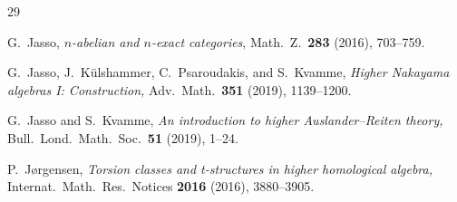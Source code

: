 \documentclass[12pt,reqno]{amsart}
\numberwithin{equation}{section}
\theoremstyle{definition}
\theoremstyle{theorem}
\theoremstyle{definition}
\begin{document}
\begin{thebibliography}{29}

  G.\ Jasso, {\it $n$-abelian and $n$-exact categories}, Math.\ Z.\ {\bf 283} (2016), 703--759.


  G.\ Jasso, J.\ K\"{u}lshammer, C.\ Psaroudakis, and S.\ Kvamme, {\it Higher Nakayama algebras I: Construction,} Adv.\ Math.\ {\bf 351} (2019), 1139--1200.

  G.\ Jasso and S.\ Kvamme, {\it An introduction to higher Auslander--Reiten theory,} Bull.\ Lond.\ Math.\ Soc.\ {\bf 51} (2019), 1--24.

%


  P.\ J\o rgensen, {\it  Torsion classes and t-structures in higher homological algebra,} Internat.\ Math.\ Res.\ Notices {\bf 2016} (2016), 3880--3905.



%



\end{thebibliography}
\end{document}
